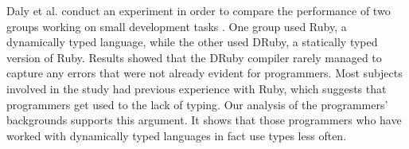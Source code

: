\documentclass[msc]{ppgccufmg}
\begin{document}
% 

Daly et al. conduct an experiment in order to compare the performance of two groups working on small development tasks \cite{ruby_vs_druby}.
One group used Ruby, a dynamically typed language, while the other used DRuby, a statically typed version of Ruby. 
Results showed that the DRuby compiler rarely managed to capture any errors that were not already evident for programmers.
Most subjects involved in the study had previous experience with Ruby, which suggests that programmers get used to the lack of typing.
Our analysis of the programmers' backgrounds supports this argument.
It shows that those programmers who have worked with dynamically typed languages in fact use types less often.








%
%
\end{document}
